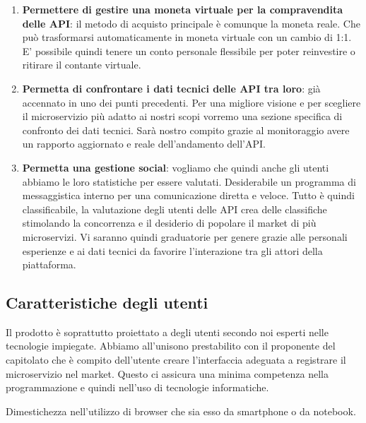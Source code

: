 \documentclass[12pt,a4paper,titlepage]{article}
\begin{document}
\begin{enumerate}
\item \textbf{Permettere di gestire una moneta virtuale per la compravendita delle API}:	il metodo di acquisto principale è comunque la moneta reale. Che può trasformarsi automaticamente in moneta virtuale con un cambio di 1:1. E' possibile quindi tenere un conto personale flessibile per poter reinvestire o ritirare il contante virtuale. 
\item \textbf{Permetta di confrontare i dati tecnici delle API tra loro}:	già accennato in uno dei punti precedenti. Per una migliore visione e per scegliere il microservizio più adatto ai nostri scopi vorremo una sezione specifica di confronto dei dati tecnici. Sarà nostro compito grazie al monitoraggio avere un rapporto aggiornato e reale dell'andamento dell'API.
\item \textbf{Permetta una gestione social}:	vogliamo che quindi anche gli utenti abbiamo le loro statistiche per essere valutati. Desiderabile un programma di messaggistica interno per una comunicazione diretta e veloce. Tutto è quindi classificabile, la valutazione degli utenti delle API crea delle classifiche stimolando la concorrenza e il desiderio di popolare il market di più microservizi. Vi saranno quindi graduatorie per genere grazie alle personali esperienze e ai dati tecnici da favorire l'interazione tra gli attori della piattaforma.
\end{enumerate}
\subsection{Caratteristiche degli utenti}
Il prodotto è soprattutto proiettato a degli utenti secondo noi esperti nelle tecnologie impiegate. Abbiamo all'unisono prestabilito con il proponente del capitolato che è compito dell'utente creare l'interfaccia adeguata a registrare il microservizio nel market. Questo ci assicura una minima competenza nella programmazione e quindi nell'uso di tecnologie informatiche.

Dimestichezza nell'utilizzo di browser che sia esso da smartphone o da notebook. 
\end{document}
